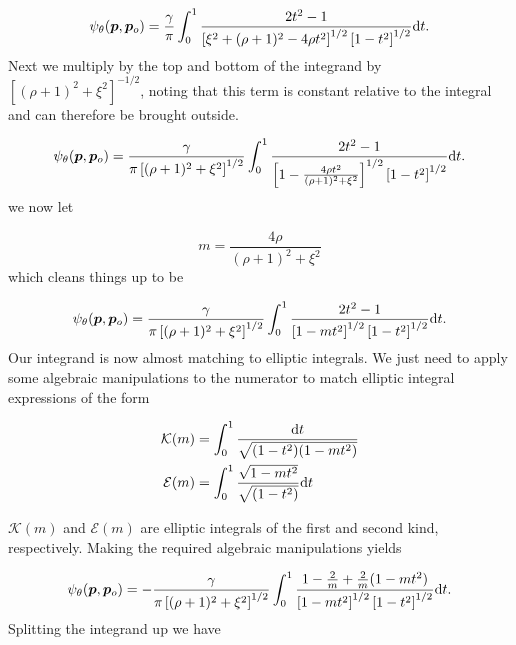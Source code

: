 \begin{equation}
    \psi_\theta(\bm{p},\bm{p}_o) = \frac{\gamma}{\pi} \int_{0}^{1} \frac{ 2t^2 -1}{\left[ \xi^2  + (\rho + 1)^2 - 4\rho t^2 \right]^{1/2} \left[1-t^2\right]^{1/2}} \mathrm{d}{t}.
\end{equation}
%
Next we multiply by the top and bottom of the integrand by \(\left[(\rho+1)^2 + \xi^2\right]^{-1/2}\), noting that this term is constant relative to the integral and can therefore be brought outside.

\begin{equation}
    \psi_\theta(\bm{p},\bm{p}_o) = \frac{\gamma}{\pi \left[(\rho+1)^2 + \xi^2\right]^{1/2}} \int_{0}^{1} \frac{ 2t^2 -1}{\left[1 - \frac{4\rho t^2}{(\rho+1)^2 + \xi^2} \right]^{1/2} \left[1-t^2\right]^{1/2}} \mathrm{d}{t}.
\end{equation}
%
we now let

\begin{equation}
    \label{eqn:mdef}
    m = \frac{4\rho}{(\rho+1)^2 + \xi^2}
\end{equation}
%
which cleans things up to be

\begin{equation}
    \psi_\theta(\bm{p},\bm{p}_o) = \frac{\gamma}{\pi \left[(\rho+1)^2 + \xi^2\right]^{1/2}} \int_{0}^{1} \frac{ 2t^2 -1}{\left[1 - m t^2 \right]^{1/2} \left[1-t^2\right]^{1/2}} \mathrm{d}{t}.
\end{equation}
%
Our integrand is now almost matching to elliptic integrals.
%
We just need to apply some algebraic manipulations to the numerator to match elliptic integral expressions of the form

\begin{align}
    \mathcal{K}(m) &= \int_0^1 \frac{\mathrm{d}{t}}{\sqrt{(1-t^2)(1-mt^2)}} \\
    \mathcal{E}(m) &= \int_0^1 \frac{\sqrt{1-mt^2}}{\sqrt{(1-t^2)}}\mathrm{d}{t}
\end{align}

\where \(\mathcal{K}(m)\) and \(\mathcal{E}(m)\) are elliptic integrals of the first and second kind, respectively.
%
Making the required algebraic manipulations yields

\begin{equation}
\psi_\theta(\bm{p},\bm{p}_o) = -\frac{\gamma}{\pi \left[(\rho+1)^2 + \xi^2\right]^{1/2}} \int_{0}^{1} \frac{ 1 - \frac{2}{m} + \frac{2}{m} (1 - mt^2) }{\left[1 - m t^2 \right]^{1/2} \left[1-t^2\right]^{1/2}} \mathrm{d}{t}.
\end{equation}
%
Splitting the integrand up we have

